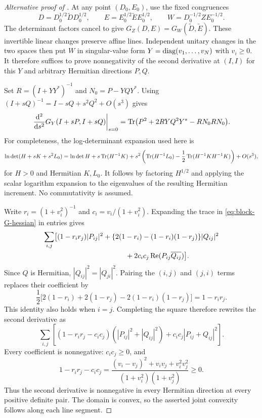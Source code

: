 \begin{proof}[Alternative proof of ]
At any point $(D_0,E_0)$, use the fixed congruences
\[
 D=D_0^{1/2}\widetilde D D_0^{1/2},\qquad
 E=E_0^{1/2}\widetilde E E_0^{1/2},\qquad
 W=D_0^{-1/2}ZE_0^{-1/2}.
\]
The determinant factors cancel to give
$G_Z(D,E)=G_W(\widetilde D,\widetilde E)$.
These invertible linear changes preserve affine lines. Independent
unitary changes in the two spaces then put $W$ in singular-value form
$Y=\operatorname{diag}(v_1,\ldots,v_N)$ with $v_i\ge0$. It therefore suffices to
prove nonnegativity of the second derivative at $(I,I)$ for this $Y$
and arbitrary Hermitian directions $P,Q$.

Set $R=(I+YY^*)^{-1}$ and $N_0=P-YQY^*$.
Using $(I+sQ)^{-1}=I-sQ+s^2Q^2+O(s^3)$ gives
\begin{equation}\label{eq:block-G-hessian}
 \left.\frac{\mathrm d^2}{\mathrm ds^2}
 G_Y(I+sP,I+sQ)\right|_{s=0}
 =\operatorname{Tr}\bigl(P^2+2RYQ^2Y^*-RN_0RN_0\bigr).
\end{equation}
For completeness, the log-determinant expansion used here is
\[
 \ln\det(H+sK+s^2L_0)
 =\ln\det H+s\operatorname{Tr}(H^{-1}K)
 +s^2\left(\operatorname{Tr}(H^{-1}L_0)
       -\frac12\operatorname{Tr}(H^{-1}KH^{-1}K)\right)+O(s^3),
\]
for $H>0$ and Hermitian $K,L_0$. It follows by factoring $H^{1/2}$
and applying the scalar logarithm expansion to the eigenvalues of the
resulting Hermitian increment. No commutativity is assumed.

Write $r_i=(1+v_i^2)^{-1}$ and $c_i=v_i/(1+v_i^2)$.
Expanding the trace in \eqref{eq:block-G-hessian} in entries gives
\begin{align*}
 \sum_{i,j}\bigl[&(1-r_ir_j)|P_{ij}|^2
 +\{2(1-r_i)-(1-r_i)(1-r_j)\}|Q_{ij}|^2\\
 &\hspace{34mm}+2c_ic_j\operatorname{Re}
       (P_{ij}\overline{Q_{ij}})\bigr].
\end{align*}
Since $Q$ is Hermitian, $|Q_{ij}|^2=|Q_{ji}|^2$.
Pairing the $(i,j)$ and $(j,i)$ terms replaces their coefficient by
\[
 \frac12\bigl[2(1-r_i)+2(1-r_j)
              -2(1-r_i)(1-r_j)\bigr]=1-r_ir_j.
\]
This identity also holds when $i=j$. Completing the square therefore
rewrites the second derivative as
\begin{equation}\label{eq:block-G-squares}
 \sum_{i,j}\left[
 (1-r_ir_j-c_ic_j)(|P_{ij}|^2+|Q_{ij}|^2)
       +c_ic_j|P_{ij}+Q_{ij}|^2\right].
\end{equation}
Every coefficient is nonnegative: $c_ic_j\ge0$, and
\[
 1-r_ir_j-c_ic_j
 =\frac{(v_i-v_j)^2+v_iv_j+v_i^2v_j^2}
        {(1+v_i^2)(1+v_j^2)}\ge0.
\]
Thus the second derivative is nonnegative in every Hermitian
direction at every positive definite pair. The domain is convex,
so the asserted joint convexity follows along each line segment.
\end{proof}
